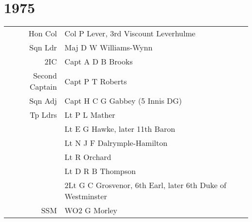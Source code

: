 \chapter*{1975}

\begin{center}
  \small
  \begin{tabular}{rl}
    Hon Col & Col P Lever, 3rd Viscount Leverhulme \\
    Sqn Ldr & Maj D W Williams-Wynn \\
    2IC & Capt A D B Brooks \\
    Second Captain & Capt P T Roberts \\
    Sqn Adj & Capt H C G Gabbey (5 Innis DG) \\
    Tp Ldrs & Lt P L Mather \\
      & Lt E G Hawke, later 11th Baron \\
      & Lt N J F Dalrymple-Hamilton \\
      & Lt R Orchard \\
      & Lt D R B Thompson \\
      & 2Lt G C Grosvenor, 6th Earl, later 6th Duke of Westminster \\
    SSM & WO2 G Morley \\
  \end{tabular}
\end{center}

